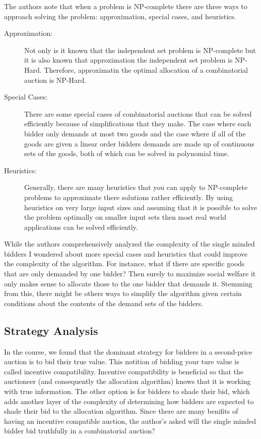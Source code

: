 \documentclass[10pt,onecolumn,letterpaper]{article}
\theoremstyle{definition}
\begin{document}
The authors note that when a problem is NP-complete there are three ways to approach solving the problem: approximation, special cases, and heuristics. 

\begin{description}
  \item [Approximation:] Not only is it known that the independent set problem is NP-complete but it is also known that approximation the independent set problem is NP-Hard. Therefore, approximatin the optimal allocation of a combinatorial auction is NP-Hard.

  \item [Special Cases:] There are some special cases of combinatorial auctions that can be solved efficiently because of simplifications that they make. The case where each bidder only demands at most two goods and the case where if all of the goods are given a linear order bidders demands are made up of continuous sets of the goods, both of which can be solved in polynomial time.

  \item [Heuristics:] Generally, there are many heuristics that you can apply to NP-complete problems to approximate there solutions rather efficiently. By using heuristics on very large input sizes and assuming that it is possible to solve the problem optimally on smaller input sets then most real world applications can be solved efficiently. 

\end{description}

While the authors comprehensively analyzed the complexity of the single minded bidders I wondered about more special cases and heuristics that could improve the complexity of the algorithm. For instance, what if there are specific goods that are only demanded by one bidder? Then surely to maximize social welfare it only makes sense to allocate those to the one bidder that demands it. Stemming from this, there might be others ways to simplify the algorithm given certain conditions about the contents of the demand sets of the bidders.

\subsection{Strategy Analysis} %

In the course, we found that the dominant strategy for bidders in a second-price auction is to bid their true value. This notition of bidding your ture value is called incentive compatibility. Incentive compatibility is beneficial so that the auctioneer (and consequently the allocation algorithm) knows that it is working with true information. The other option is for bidders to shade their bid, which adds another layer of the complexity of determining how bidders are expected to shade their bid to the allocation algorithm. Since there are many benifits of having an incentive compatible auction, the author's asked will the single minded bidder bid truthfully in a combinatorial auction?
\end{document}
